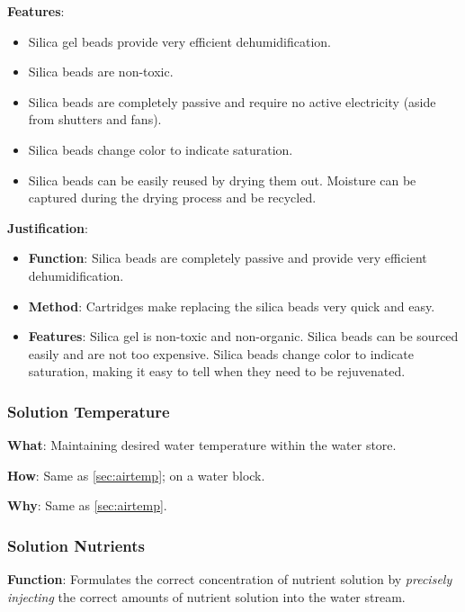 \documentclass{report}
\begin{document}
\textbf{Features}:
\begin{itemize}
    \item Silica gel beads provide very efficient dehumidification.
    \item Silica beads are non-toxic.
    \item Silica beads are completely passive and require no active electricity (aside from shutters and fans).
    \item Silica beads change color to indicate saturation.
    \item Silica beads can be easily reused by drying them out. Moisture can be captured during the drying process and be recycled.
\end{itemize}

\textbf{Justification}: 
\begin{itemize}
    \item \textbf{Function}: Silica beads are completely passive and provide very efficient dehumidification.
    \item \textbf{Method}: Cartridges make replacing the silica beads very quick and easy. 
    \item \textbf{Features}: Silica gel is non-toxic and non-organic. Silica beads can be sourced easily and are not too expensive. Silica beads change color to indicate saturation, making it easy to tell when they need to be rejuvenated.
\end{itemize}

\newpage



\subsubsection{Solution Temperature}
\label{sec:watertemp}

\textbf{What}: Maintaining desired water temperature within the water store.

\textbf{How}: Same as \ref{sec:airtemp}; on a water block.

\textbf{Why}: Same as \ref{sec:airtemp}.

\subsubsection{Solution Nutrients}
\label{sec:nutrients}

\textbf{Function}: Formulates the correct concentration of nutrient solution by \textit{precisely injecting} the correct amounts of nutrient solution into the water stream.
\end{document}
